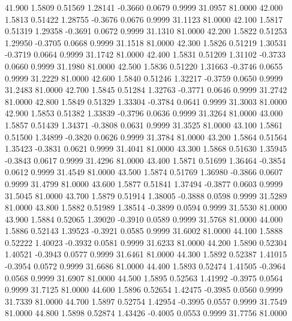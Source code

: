   41.900   1.5809   0.51569   1.28141  -0.3660   0.0679   0.9999  31.0957  81.0000
  42.000   1.5813   0.51422   1.28755  -0.3676   0.0676   0.9999  31.1123  81.0000
  42.100   1.5817   0.51319   1.29358  -0.3691   0.0672   0.9999  31.1310  81.0000
  42.200   1.5822   0.51253   1.29950  -0.3705   0.0668   0.9999  31.1518  81.0000
  42.300   1.5826   0.51219   1.30531  -0.3719   0.0664   0.9999  31.1742  81.0000
  42.400   1.5831   0.51209   1.31102  -0.3733   0.0660   0.9999  31.1980  81.0000
  42.500   1.5836   0.51220   1.31663  -0.3746   0.0655   0.9999  31.2229  81.0000
  42.600   1.5840   0.51246   1.32217  -0.3759   0.0650   0.9999  31.2483  81.0000
  42.700   1.5845   0.51284   1.32763  -0.3771   0.0646   0.9999  31.2742  81.0000
  42.800   1.5849   0.51329   1.33304  -0.3784   0.0641   0.9999  31.3003  81.0000
  42.900   1.5853   0.51382   1.33839  -0.3796   0.0636   0.9999  31.3264  81.0000
  43.000   1.5857   0.51439   1.34371  -0.3808   0.0631   0.9999  31.3525  81.0000
  43.100   1.5861   0.51500   1.34899  -0.3820   0.0626   0.9999  31.3784  81.0000
  43.200   1.5864   0.51564   1.35423  -0.3831   0.0621   0.9999  31.4041  81.0000
  43.300   1.5868   0.51630   1.35945  -0.3843   0.0617   0.9999  31.4296  81.0000
  43.400   1.5871   0.51699   1.36464  -0.3854   0.0612   0.9999  31.4549  81.0000
  43.500   1.5874   0.51769   1.36980  -0.3866   0.0607   0.9999  31.4799  81.0000
  43.600   1.5877   0.51841   1.37494  -0.3877   0.0603   0.9999  31.5045  81.0000
  43.700   1.5879   0.51914   1.38005  -0.3888   0.0598   0.9999  31.5289  81.0000
  43.800   1.5882   0.51989   1.38514  -0.3899   0.0594   0.9999  31.5530  81.0000
  43.900   1.5884   0.52065   1.39020  -0.3910   0.0589   0.9999  31.5768  81.0000
  44.000   1.5886   0.52143   1.39523  -0.3921   0.0585   0.9999  31.6002  81.0000
  44.100   1.5888   0.52222   1.40023  -0.3932   0.0581   0.9999  31.6233  81.0000
  44.200   1.5890   0.52304   1.40521  -0.3943   0.0577   0.9999  31.6461  81.0000
  44.300   1.5892   0.52387   1.41015  -0.3954   0.0572   0.9999  31.6686  81.0000
  44.400   1.5893   0.52474   1.41505  -0.3964   0.0568   0.9999  31.6907  81.0000
  44.500   1.5895   0.52563   1.41992  -0.3975   0.0564   0.9999  31.7125  81.0000
  44.600   1.5896   0.52654   1.42475  -0.3985   0.0560   0.9999  31.7339  81.0000
  44.700   1.5897   0.52754   1.42954  -0.3995   0.0557   0.9999  31.7549  81.0000
  44.800   1.5898   0.52874   1.43426  -0.4005   0.0553   0.9999  31.7756  81.0000
